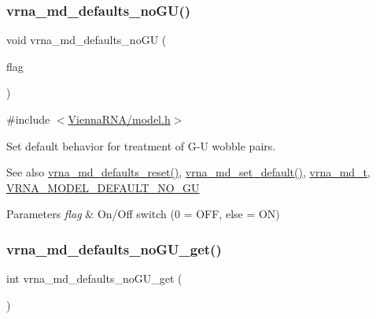 \subsubsection{\texorpdfstring{vrna\+\_\+md\+\_\+defaults\+\_\+no\+G\+U()}{vrna\_md\_defaults\_noGU()}}
{\footnotesize\ttfamily void vrna\+\_\+md\+\_\+defaults\+\_\+no\+GU (\begin{DoxyParamCaption}\item[{int}]{flag }\end{DoxyParamCaption})}



{\ttfamily \#include $<$\mbox{\hyperlink{model_8h}{Vienna\+R\+N\+A/model.\+h}}$>$}



Set default behavior for treatment of G-\/U wobble pairs. 

\begin{DoxySeeAlso}{See also}
\mbox{\hyperlink{group__model__details_ga70834424cf804d149937de89f80ceb45}{vrna\+\_\+md\+\_\+defaults\+\_\+reset()}}, \mbox{\hyperlink{group__model__details_ga8ac6ff84936282436f822644bf841f66}{vrna\+\_\+md\+\_\+set\+\_\+default()}}, \mbox{\hyperlink{group__model__details_ga1f8a10e12a0a1915f2a4eff0b28ea17c}{vrna\+\_\+md\+\_\+t}}, \mbox{\hyperlink{group__model__details_ga34702f7d14d38b877ba8e475281e97e2}{V\+R\+N\+A\+\_\+\+M\+O\+D\+E\+L\+\_\+\+D\+E\+F\+A\+U\+L\+T\+\_\+\+N\+O\+\_\+\+GU}} 
\end{DoxySeeAlso}

\begin{DoxyParams}{Parameters}
{\em flag} & On/\+Off switch (0 = O\+FF, else = ON) \\
\hline
\end{DoxyParams}
\mbox{\label{group__model__details_ga5faa7d4e536d7fe36ec25428c0cf2563}} 
\subsubsection{\texorpdfstring{vrna\+\_\+md\+\_\+defaults\+\_\+no\+G\+U\+\_\+get()}{vrna\_md\_defaults\_noGU\_get()}}
{\footnotesize\ttfamily int vrna\+\_\+md\+\_\+defaults\+\_\+no\+G\+U\+\_\+get (\begin{DoxyParamCaption}\item[{void}]{ }\end{DoxyParamCaption})}



